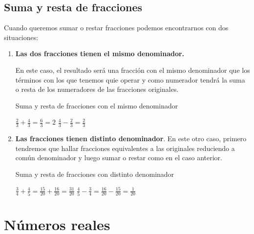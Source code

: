 \subsection{Suma y resta de fracciones}

Cuando queremos sumar o restar fracciones podemos encontrarnos con dos situaciones:

\begin{enumerate}
    \item \textbf{Las dos fracciones tienen el mismo denominador.}

    En este caso, el resultado será una fracción con el mismo denominador que los términos con los que tenemos quie operar y como numerador tendrá la suma o resta de los numeradores de las fracciones originales.

    \begin{ejemplos}[label={Ejemplo:sumaRestaFraccionesIgualDenominador}]{Suma y resta de fracciones con el mismo denominador}
        \begin{center}
            $\displaystyle \frac{2}{3} + \frac{4}{3} = \frac{6}{3} = 2$ \qquad \qquad $\displaystyle \frac{4}{3} - \frac{2}{3} = \frac{2}{3}$
        \end{center}
    \end{ejemplos}

    \item \textbf{Las fracciones tienen distinto denominador}.
    En este otro caso, primero tendremos que hallar fracciones equivalentes a las originales reduciendo a común denominador y luego sumar o restar como en el caso anterior.

    \begin{ejemplos}[label={sumaRestaFraccionesDistintoDenominador}]{Suma y resta de fracciones con distinto denominador}
        \begin{center}
            $\displaystyle \frac{3}{4} + \frac{4}{5} = \frac{15}{20} + \frac{16}{20} = \frac{31}{20}$ \qquad \qquad $\displaystyle \frac{4}{5} - \frac{3}{4} = \frac{16}{20} - \frac{15}{20} = \frac{1}{20}$
        \end{center}
        
    \end{ejemplos}
\end{enumerate}



\section{Números reales}